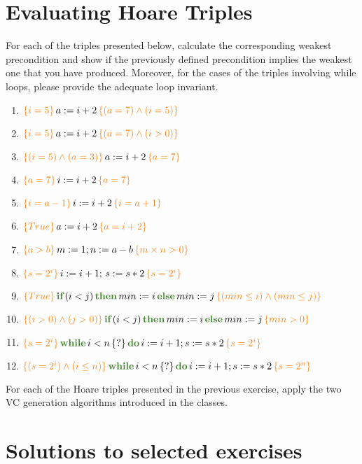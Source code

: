 \documentclass[11pt]{article}
\newcommand{\kw}[1]{{\color{OliveGreen}{#1}}}
\newcommand{\hoaret}[3]{{\color{BurntOrange}{\{#1\}}}\,#2\,{\color{BurntOrange}{\{#3\}}}}
\begin{document}
\newcommand{\compn}[1]{\textsf{\textcolor{purple}{#1}}\xspace}
\newcommand{\chn}[1]{\textsf{\textcolor{teal}{#1}}\xspace}

\section*{Evaluating Hoare Triples}

 For each of the triples presented below, calculate the corresponding weakest precondition and show if the previously defined precondition implies the weakest one that you have produced. Moreover, for the cases of the triples involving while loops, please provide the adequate loop invariant.
\begin{enumerate}
  \item $\hoaret{i = 5}{a := i + 2}{(a = 7) \land (i = 5)}$
  \item $\hoaret{i = 5}{a := i + 2}{(a = 7) \land (i > 0)}$
  \item $\hoaret{(i = 5) \land (a = 3)}{a := i + 2}{a = 7}$
  \item $\hoaret{a = 7}{i := i + 2}{a = 7}$
  \item $\hoaret{i = a - 1}{i := i + 2}{i = a + 1}$
  \item $\hoaret{True}{a := i + 2}{a = i + 2}$
  \item $\hoaret{a > b}{m := 1; n := a - b}{m \times n > 0}$
  \item $\hoaret{s = 2^i}{i := i + 1;\,s := s * 2}{s = 2^i}$
  \item $\hoaret{True}{\textbf{\kw{if}}\,(i<j)\,\textbf{\kw{then}}\,min := i\,\textbf{\kw{else}}\,min := j}{(min \leq i) \land (min \leq j)}$
  \item $\hoaret{(i > 0) \land (j > 0)}{\textbf{\kw{if}}\,(i<j)\,\textbf{\kw{then}}\,min := i\,\textbf{\kw{else}}\,min := j}{min > 0}$
  \item $\hoaret{s = 2^i}{\textbf{\kw{while}}\,i<n\,\{?\}\,\textbf{\kw{do}}\,i := i +1 ;s := s*2}{s = 2^i}$
  \item $\hoaret{(s = 2^i) \land (i \leq n)}{\textbf{\kw{while}}\,i<n\,\{?\}\,\textbf{\kw{do}}\,i := i +1 ;s := s*2}{s = 2^n}$
\end{enumerate}


 For each of the Hoare triples presented in the previous exercise, apply the two VC generation algorithms introduced in the classes.

\section*{Solutions to selected exercises}
\end{document}
